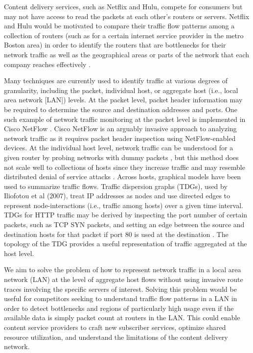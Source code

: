 \documentclass[conference]{IEEEtran}
\begin{document}
Content delivery services, such as Netflix and Hulu, compete for consumers but may not have access to read the packets at each other’s routers or servers. Netflix and Hulu would be motivated to compare their traffic flow patterns among a collection of routers (such as for a certain internet service provider in the metro Boston area) in order to identify the routers that are bottlenecks for their network traffic as well as the geographical areas or parts of the network that each company reaches effectively \cite{b1}.

Many techniques are currently used to identify traffic at various degrees of granularity, including the packet, individual host, or aggregate host (i.e., local area network [LAN]) levels. At the packet level, packet header information may be required to determine the source and destination addresses and ports. One such example of network traffic monitoring at the packet level is implemented in Cisco NetFlow \cite{b2}. Cisco NetFlow is an arguably invasive approach to analyzing network traffic as it requires packet header inspection using NetFlow-enabled devices. At the individual host level, network traffic can be understood for a given router by probing networks with dummy packets \cite{b3}, but this method does not scale well to collections of hosts since they increase traffic and may resemble distributed denial of service attacks \cite{b4}. Across hosts, graphical models have been used to summarize traffic flows. Traffic dispersion graphs (TDGs), used by Iliofotou et al (2007), treat IP addresses as nodes and use directed edges to represent node-interactions (i.e., traffic among hosts) over a given time interval. TDGs for HTTP traffic may be derived by inspecting the port number of certain packets, such as TCP SYN packets, and setting an edge between the source and destination hosts for that packet if port 80 is used at the destination \cite{b5}. The topology of the TDG provides a useful representation of traffic aggregated at the host level.

We aim to solve the problem of how to represent network traffic in a local area network (LAN) at the level of aggregate host flows without using invasive route traces involving the specific servers of interest. Solving this problem would be useful for competitors seeking to understand traffic flow patterns in a LAN in order to detect bottlenecks and regions of particularly high usage even if the available data is simply packet count at routers in the LAN. This could enable content service providers to craft new subscriber services, optimize shared resource utilization, and understand the limitations of the content delivery network.
\end{document}
